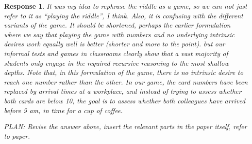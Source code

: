 \documentclass[a4paper]{article}
\newtheorem{response}{Response}
\newenvironment{robin}{\smallskip \noindent \color{red!10!green!50!blue}}{\color{black}\smallskip}
\newenvironment{tobo}{\smallskip \noindent \color{yellow!80!black!80}}{\color{black}\smallskip}
\begin{document}
\begin{itemize}
\begin{response}
\begin{robin}
\begin{tobo} It was my idea to rephrase the riddle as a game, so we can not just refer to it as ``playing the riddle'', I think. Also, it is confusing with the different variants of the game. It should be shortened, perhaps the earlier formulation where we say that playing the game with numbers and no underlying intrinsic desires work equally well is better (shorter and more to the point). 
\end{tobo}
but our informal tests and games in classrooms clearly show that a vast majority of students only engage in the required recursive reasoning to the most shallow depths. Note that, in this formulation of the game, there is no intrinsic desire to reach one number rather than the other. In our game, the card numbers have been replaced by arrival times at a workplace, and instead of trying to assess whether both cards are below 10, the goal is to assess whether both colleagues have arrived before 9 am, in time for a cup of coffee.

PLAN: Revise the answer above, insert the relevant parts in the paper itself, refer to paper. 
\end{robin}
 \end{response}


\end{itemize}
\end{document}
